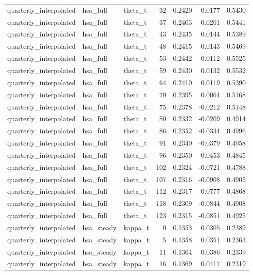 \begin{tabular}{lllrrrr}
quarterly\_interpolated & hsa\_full & theta\_t & 32 & 0.2420 & 0.0177 & 0.5430 \\
quarterly\_interpolated & hsa\_full & theta\_t & 37 & 0.2403 & 0.0201 & 0.5441 \\
quarterly\_interpolated & hsa\_full & theta\_t & 43 & 0.2435 & 0.0144 & 0.5389 \\
quarterly\_interpolated & hsa\_full & theta\_t & 48 & 0.2415 & 0.0143 & 0.5469 \\
quarterly\_interpolated & hsa\_full & theta\_t & 53 & 0.2442 & 0.0112 & 0.5525 \\
quarterly\_interpolated & hsa\_full & theta\_t & 59 & 0.2430 & 0.0132 & 0.5532 \\
quarterly\_interpolated & hsa\_full & theta\_t & 64 & 0.2410 & 0.0119 & 0.5390 \\
quarterly\_interpolated & hsa\_full & theta\_t & 70 & 0.2395 & 0.0064 & 0.5168 \\
quarterly\_interpolated & hsa\_full & theta\_t & 75 & 0.2378 & -0.0212 & 0.5148 \\
quarterly\_interpolated & hsa\_full & theta\_t & 80 & 0.2332 & -0.0209 & 0.4914 \\
quarterly\_interpolated & hsa\_full & theta\_t & 86 & 0.2352 & -0.0334 & 0.4996 \\
quarterly\_interpolated & hsa\_full & theta\_t & 91 & 0.2340 & -0.0379 & 0.4958 \\
quarterly\_interpolated & hsa\_full & theta\_t & 96 & 0.2350 & -0.0453 & 0.4845 \\
quarterly\_interpolated & hsa\_full & theta\_t & 102 & 0.2324 & -0.0721 & 0.4788 \\
quarterly\_interpolated & hsa\_full & theta\_t & 107 & 0.2316 & -0.0908 & 0.4905 \\
quarterly\_interpolated & hsa\_full & theta\_t & 112 & 0.2317 & -0.0777 & 0.4868 \\
quarterly\_interpolated & hsa\_full & theta\_t & 118 & 0.2309 & -0.0844 & 0.4908 \\
quarterly\_interpolated & hsa\_full & theta\_t & 123 & 0.2315 & -0.0851 & 0.4925 \\
quarterly\_interpolated & hsa\_steady & kappa\_t & 0 & 0.1353 & 0.0305 & 0.2389 \\
quarterly\_interpolated & hsa\_steady & kappa\_t & 5 & 0.1358 & 0.0351 & 0.2363 \\
quarterly\_interpolated & hsa\_steady & kappa\_t & 11 & 0.1364 & 0.0386 & 0.2339 \\
quarterly\_interpolated & hsa\_steady & kappa\_t & 16 & 0.1369 & 0.0417 & 0.2319 \\

\end{tabular}
